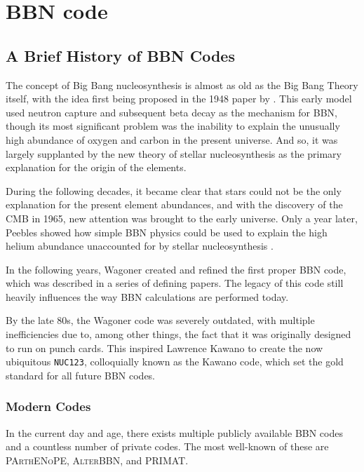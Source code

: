 
\chapter{BBN code}
\label{chap:BBNcode}

\section{A Brief History of BBN Codes}
\label{sec:BBN_history}

The concept of Big Bang nucleosynthesis is almost as old as the Big Bang Theory itself, with the idea first being proposed in the 1948 paper by \textcite{Gamov48}. This early model used neutron capture and subsequent beta decay as the mechanism for BBN, though its most significant problem was the inability to explain the unusually high abundance of oxygen and carbon in the present universe. And so, it was largely supplanted by the new theory of stellar nucleosynthesis as the primary explanation for the origin of the elements. 

During the following decades, it became clear that stars could not be the only explanation for the present element abundances, and with the discovery of the CMB in 1965, new attention was brought to the early universe. 
Only a year later, Peebles showed how simple BBN physics could be used to explain the high helium abundance unaccounted for by stellar nucleosynthesis \cite{Peebles66}.

In the following years, Wagoner created and refined the first proper BBN code, which was described in a series of defining papers\cite{Wagoner67}\cite{Wagoner69}\cite{Wagoner72}. The legacy of this code still heavily influences the way BBN calculations are performed today.

By the late 80s, the Wagoner code was severely outdated, with multiple inefficiencies due to, among other things, the fact that it was originally designed to run on punch cards. This inspired Lawrence Kawano to create the now ubiquitous \texttt{NUC123}, colloquially known as the Kawano code\cite{Kawano}, which set the gold standard for all future BBN codes. 

\subsection{Modern Codes}
\label{sec:newcodes}
In the current day and age, there exists multiple publicly available BBN codes and a countless number of private codes. The most well-known of these are \textsc{PArthENoPE}, \textsc{AlterBBN}, and PRIMAT.

